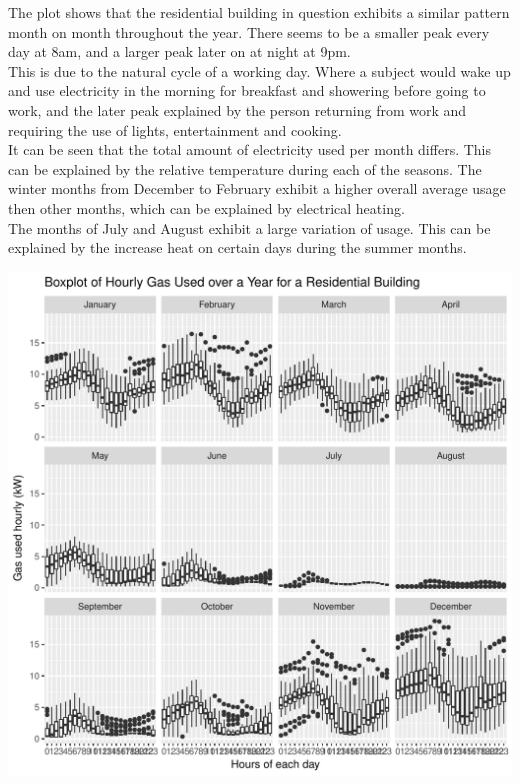 \documentclass[12pt]{article}\usepackage[]{graphicx}\usepackage[]{color}
\makeatletter
\def\maxwidth{ %
  \ifdim\Gin@nat@width>\linewidth
    \linewidth
  \else
    \Gin@nat@width
  \fi
}
\newenvironment{knitrout}{}{} %
\makeatother
\begin{document}
The plot shows that the residential building in question exhibits a similar pattern month on month throughout the year. There seems to be a smaller peak every day at 8am, and a larger peak later on at night at 9pm. \\

This is due to the natural cycle of a working day. Where a subject would wake up and use electricity in the morning for breakfast and showering before going to work, and the later peak explained by the person returning from work and requiring the use of lights, entertainment and cooking.\\

It can be seen that the total amount of electricity used per month differs. This can be explained by the relative temperature during each of the seasons. The winter months from December to February exhibit a higher overall average usage then other months, which can be explained by electrical heating. \\

The months of July and August exhibit a large variation of usage. This can be explained by the increase heat on certain days during the summer months.




\begin{knitrout}
\color{fgcolor}
\includegraphics[width=\maxwidth]{figure/gas_plot-1} 

\end{knitrout}
\end{document}
